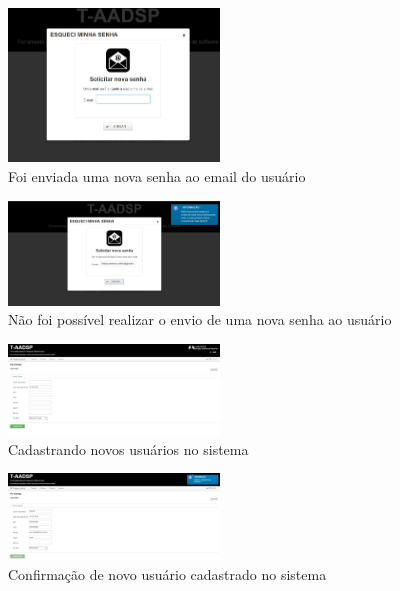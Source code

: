 \documentclass{acm_proc_article-sp}
\begin{document}
\begin{appendices}
\begin{figure}[h]
\centering %
\includegraphics[width=0.5\textwidth]{RF_autenticacao_solicitar_nova_senha.jpg} %
\caption{Foi enviada uma nova senha ao email do usuário }
\end{figure}

\begin{figure}[h]
\centering %
\includegraphics[width=0.5\textwidth]{RF_autenticacao_falha_ao_enviar_senha.jpg} %
\caption{Não foi possível realizar o envio de uma nova senha ao usuário}
\end{figure}

\begin{figure}[h]
\centering %
\includegraphics[width=0.5\textwidth]{RF_cadastro_de_usuario.jpg} %
\caption{Cadastrando novos usuários no sistema}
\end{figure}

\begin{figure}[h]
\centering %
\includegraphics[width=0.5\textwidth]{RF_cadastro_de_usuario_realizado.jpg} %
\caption{Confirmação de novo usuário cadastrado no sistema}
\end{figure}


\end{appendices}
\end{document}
